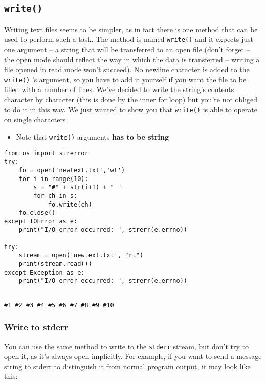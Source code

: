 \documentclass[11pt]{article}
\begin{document}
\subsection{\texttt{write()}}
\label{sec:orgd7f43a3}
Writing text files seems to be simpler, as in fact there is one method
that can be used to perform such a task.  The method is named
\texttt{write()} and it expects just one argument – a string that will be
transferred to an open file (don’t forget – the open mode should
reflect the way in which the data is transferred – writing a file
opened in read mode won’t succeed).  No newline character is added to
the \texttt{write()} ’s argument, so you have to add it yourself if you want
the file to be filled with a number of lines. We’ve decided to write
the string’s contents character by character (this is done by the
inner for loop) but you’re not obliged to do it in this way. We just
wanted to show you that \texttt{write()} is able to operate on single
characters.

\begin{itemize}
\item Note that \texttt{write()} arguments \textbf{has to be string}
\end{itemize}

\begin{verbatim}
from os import strerror
try:
	fo = open('newtext.txt','wt')
	for i in range(10):
		s = "#" + str(i+1) + " "
		for ch in s:
			fo.write(ch)
	fo.close()
except IOError as e:
	print("I/O error occurred: ", strerr(e.errno))

try:
    stream = open('newtext.txt', "rt")
    print(stream.read())
except Exception as e:
	print("I/O error eccurred: ", strerr(e.errno))


\end{verbatim}

\begin{verbatim}
#1 #2 #3 #4 #5 #6 #7 #8 #9 #10 
\end{verbatim}

\subsubsection{Write to stderr}
\label{sec:org138a2b8}
You can use the same method to write to the \texttt{stderr} stream, but
don’t try to open it, as it’s always open implicitly. For example, if
you want to send a message string to stderr to distinguish it from
normal program output, it may look like this:
\end{document}
